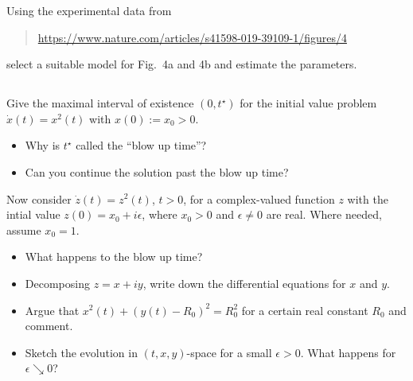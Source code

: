 \documentclass[12pt,a4paper]{article}
\begin{document}
    
    Using the experimental data from
    \begin{quote}
        \url{https://www.nature.com/articles/s41598-019-39109-1/figures/4}
    \end{quote}
    select a suitable model for Fig.~4a and 4b
    and estimate the parameters.

    
    \subsection{}
    
    Give the maximal interval of existence $(0, t^\star)$
    for the initial value problem
    $\dot{x}(t) = x^2(t)$
    with
    $x(0) := x_0 > 0$.
    
    \begin{itemize}
    \item 
        Why is $t^\star$ called the ``blow up time''?
    \item
        Can you continue the solution past the blow up time?
    \end{itemize}

    
    Now consider 
    $\dot{z}(t) = z^2(t)$, $t > 0$,
    for a complex-valued function $z$
    with the intial value
    $z(0) = x_0 + i \epsilon$,
    where $x_0 > 0$ and $\epsilon \neq 0$ are real.
    Where needed, assume $x_0 = 1$.

    \begin{itemize}
    \item 
        What happens to the blow up time?
    \item
        Decomposing $z = x + i y$,
        write down the differential equations for $x$ and $y$.
    \item
        Argue that $x^2(t) + (y(t) - R_0)^2 = R_0^2$
        for a certain real constant $R_0$
        and
        comment.
    \item
        Sketch the evolution in $(t, x, y)$-space 
        for a small $\epsilon > 0$.
        What happens for $\epsilon \searrow 0$?
    \end{itemize}

    
    
    \subsection{}
    
\end{document}
